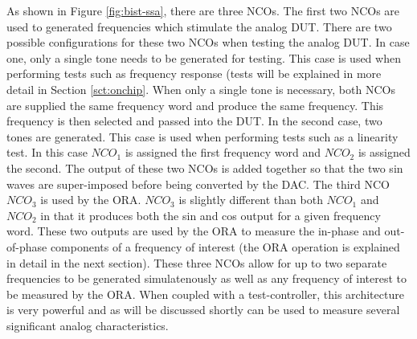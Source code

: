 \documentclass[12pt]{report}
\begin{document}
As shown in Figure \ref{fig:bist-ssa}, there are three NCOs.  The first two NCOs are used to generated frequencies which stimulate the analog DUT.  There are two possible configurations for these two NCOs when testing the analog DUT.  In case one, only a single tone needs to be generated for testing.  This case is used when performing tests such as frequency response (tests will be explained in more detail in Section \ref{sct:onchip}.  When only a single tone is necessary, both NCOs are supplied the same frequency word and produce the same frequency.  This frequency is then selected and passed into the DUT.  In the second case, two tones are generated.  This case is used when performing tests such as a linearity test.  In this case $NCO_1$ is assigned the first frequency word and $NCO_2$ is assigned the second.  The output of these two NCOs is added together so that the two sin waves are super-imposed before being converted by the DAC\cite{jie}.  The third NCO $NCO_3$ is used by the ORA.  $NCO_3$ is slightly different than both $NCO_1$ and $NCO_2$ in that it produces both the sin and cos output for a given frequency word.  These two outputs are used by the ORA to measure the in-phase and out-of-phase components of a frequency of interest (the ORA operation is explained in detail in the next section)\cite{jie}.   These three NCOs allow for up to two separate frequencies to be generated simulatenously as well as any frequency of interest to be measured by the ORA.  When coupled with a test-controller, this architecture is very powerful and as will be discussed shortly can be used to measure several significant analog characteristics.

\end{document}
